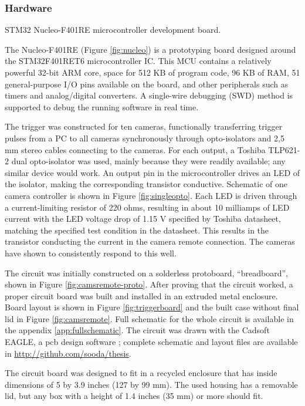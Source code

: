 \subsubsection{Hardware}

{STM32 Nucleo-F401RE microcontroller development board.}

The Nucleo-F401RE (Figure \ref{fig:nucleo}) is a prototyping board designed around the STM32F401RET6 microcontroller IC.
This MCU contains a relatively powerful 32-bit ARM core, space for 512 KB of program code, 96 KB of RAM, 51 general-purpose I/O pins available on the board, and other peripherals such as timers and analog/digital converters.
A single-wire debugging (SWD) method is supported to debug the running software in real time. \cite{stnucleo}

The trigger was constructed for ten cameras, functionally transferring trigger pulses from a PC to all cameras synchronously through opto-isolators and 2,5 mm stereo cables connecting to the cameras.
For each output, a Toshiba TLP621-2 dual opto-isolator was used, mainly because they were readily available; any similar device would work.
An output pin in the microcontroller drives an LED of the isolator, making the corresponding transistor conductive.
Schematic of one camera controller is shown in Figure \ref{fig:singleopto}.
Each LED is driven through a current-limiting resistor of 220 ohms, resulting in about 10 milliamps of LED current with the LED voltage drop of 1.15 V specified by Toshiba datasheet, matching the specified test condition in the datasheet. \cite{tlp621}
This results in the transistor conducting the current in the camera remote connection.
The cameras have shown to consistently respond to this well.

The circuit was initially constructed on a solderless protoboard, ``breadboard'', shown in Figure \ref{fig:camsremote-proto}.
After proving that the circuit worked, a proper circuit board was built and installed in an extruded metal enclosure.
Board layout is shown in Figure \ref{fig:triggerboard} and the built case without final lid in Figure \ref{fig:camsremote}.
Full schematic for the whole circuit is available in the appendix \ref{app:fullschematic}.
The circuit was drawn with the Cadsoft EAGLE, a pcb design software \cite{eaglepcb}; complete schematic and layout files are available in \url {http://github.com/sooda/thesis}.

The circuit board was designed to fit in a recycled enclosure that has inside dimensions of 5 by 3.9 inches (127 by 99 mm).
The used housing has a removable lid, but any box with a height of 1.4 inches (35 mm) or more should fit.

